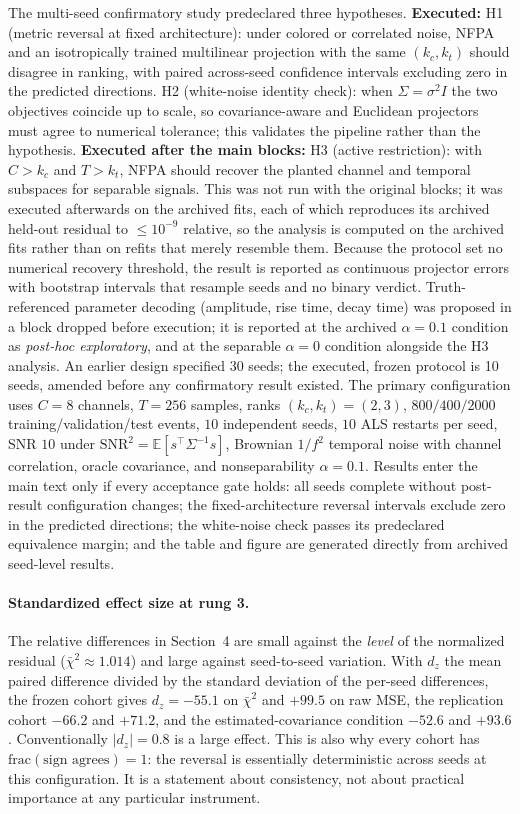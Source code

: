 The multi-seed confirmatory study predeclared three hypotheses. \textbf{Executed:} H1 (metric reversal at fixed architecture): under colored or correlated noise, NFPA and an isotropically trained multilinear projection with the same $(k_c,k_t)$ should disagree in ranking, with paired across-seed confidence intervals excluding zero in the predicted directions. H2 (white-noise identity check): when $\Sigma=\sigma^2I$ the two objectives coincide up to scale, so covariance-aware and Euclidean projectors must agree to numerical tolerance; this validates the pipeline rather than the hypothesis. \textbf{Executed after the main blocks:} H3 (active restriction): with $C>k_c$ and $T>k_t$, NFPA should recover the planted channel and temporal subspaces for separable signals. This was not run with the original blocks; it was executed afterwards on the archived fits, each of which reproduces its archived held-out residual to $\leq10^{-9}$ relative, so the analysis is computed on the archived fits rather than on refits that merely resemble them. Because the protocol set no numerical recovery threshold, the result is reported as continuous projector errors with bootstrap intervals that resample seeds and no binary verdict. Truth-referenced parameter decoding (amplitude, rise time, decay time) was proposed in a block dropped before execution; it is reported at the archived $\alpha=0.1$ condition as \emph{post-hoc exploratory}, and at the separable $\alpha=0$ condition alongside the H3 analysis. An earlier design specified 30 seeds; the executed, frozen protocol is 10 seeds, amended before any confirmatory result existed. The primary configuration uses $C=8$ channels, $T=256$ samples, ranks $(k_c,k_t)=(2,3)$, $800/400/2000$ training/validation/test events, $10$ independent seeds, $10$ ALS restarts per seed, SNR $10$ under $\mathrm{SNR}^2=\mathbb{E}[s^\top\Sigma^{-1}s]$, Brownian $1/f^2$ temporal noise with channel correlation, oracle covariance, and nonseparability $\alpha=0.1$. Results enter the main text only if every acceptance gate holds: all seeds complete without post-result configuration changes; the fixed-architecture reversal intervals exclude zero in the predicted directions; the white-noise check passes its predeclared equivalence margin; and the table and figure are generated directly from archived seed-level results.

\paragraph{Standardized effect size at rung 3.} The relative differences in Section~4 are small against the \emph{level} of the normalized residual ($\bar\chi^2\approx1.014$) and large against seed-to-seed variation. With $d_z$ the mean paired difference divided by the standard deviation of the per-seed differences, the frozen cohort gives $d_z=-55.1$ on $\bar\chi^2$ and $+99.5$ on raw MSE, the replication cohort $-66.2$ and $+71.2$, and the estimated-covariance condition $-52.6$ and $+93.6$. Conventionally $|d_z|=0.8$ is a large effect. This is also why every cohort has $\text{frac}(\text{sign agrees})=1$: the reversal is essentially deterministic across seeds at this configuration. It is a statement about consistency, not about practical importance at any particular instrument.

